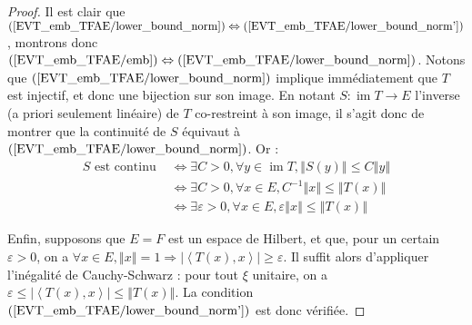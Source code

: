 \documentclass[a4paper,12pt]{article}
\newcommand{\N}{\mathbb{N}}
\newcommand{\norm}[1]{\left\Vert #1\right\Vert}
\newcommand{\abs}[1]{\left\vert#1\right\vert}
\newcommand{\ket}[1]{\left\langle #1 \right\rangle}
\newcommand{\inv}{^{-1}}
\newcommand{\comp}{\circ}
\renewcommand{\implies}{\Rightarrow}
\renewcommand{\iff}{\Leftrightarrow}
\DeclareMathOperator{\Ima}{im}
\begin{document}
\begin{proof}
    Il est clair que $(\ref{EVT_emb_TFAE/lower_bound_norm}) \iff(\ref{EVT_emb_TFAE/lower_bound_norm'})$, montrons donc $(\ref{EVT_emb_TFAE/emb}) \iff(\ref{EVT_emb_TFAE/lower_bound_norm})$. Notons que $(\ref{EVT_emb_TFAE/lower_bound_norm})$ implique
    immédiatement que $T$ est injectif, et donc une bijection sur son image. En notant $S:\Ima T\to E$ l'inverse (a priori seulement linéaire) de $T$ co-restreint à son image, 
    il s'agit donc de montrer que la continuité de $S$ équivaut à $(\ref{EVT_emb_TFAE/lower_bound_norm})$. Or :
    \begin{align*}
        S\text{ est continu }
            &\iff \exists C>0, \forall y\in\Ima T, \norm{S(y)} \le C\norm{y} \\
            &\iff \exists C>0, \forall x\in E, C\inv\norm{x} \le \norm{T(x)} \\
            &\iff \exists\varepsilon>0, \forall x\in E, \varepsilon\norm{x} \le \norm{T(x)}
    \end{align*}

    Enfin, supposons que $E=F$ est un espace de Hilbert, et que, pour un certain $\varepsilon>0$, on a $\forall x\in E, \norm{x} = 1 \implies \abs{\ket{T(x), x}}\ge\varepsilon$.
    Il suffit alors d'appliquer l'inégalité de Cauchy-Schwarz : pour tout $\xi$ unitaire, on a $\varepsilon\le\abs{\ket{T(x), x}}\le\norm{T(x)}$. La condition $(\ref{EVT_emb_TFAE/lower_bound_norm'})$
    est donc vérifiée.
\end{proof}
\end{document}
